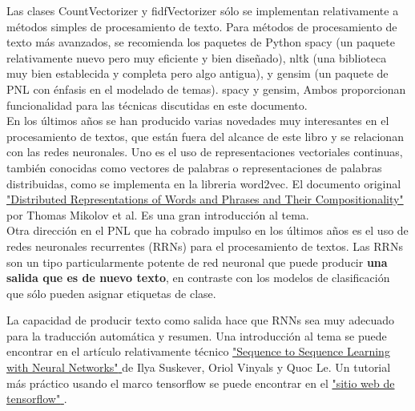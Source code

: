 Las clases {\ttfamily CountVectorizer}  y  {\ttfamily fidfVectorizer} sólo se implementan relativamente a métodos simples   de procesamiento de texto. Para métodos de procesamiento de texto más avanzados,  
se recomienda  los paquetes de Python {\ttfamily spacy} (un paquete relativamente nuevo pero muy  
eficiente y bien diseñado), {\ttfamily nltk} (una biblioteca muy bien establecida y completa pero algo antigua), y {\ttfamily gensim} (un paquete de PNL con énfasis en el modelado de temas). 
 {\ttfamily spacy}   y {\ttfamily gensim,}  Ambos    proporcionan funcionalidad para las técnicas 
discutidas  en  este  documento. \\

En los últimos años se han producido varias novedades muy interesantes en el procesamiento de textos,
que están fuera del alcance de este libro y se relacionan con las redes neuronales.
Uno  es el uso de representaciones vectoriales continuas, también conocidas como vectores
 de palabras o representaciones de palabras distribuidas, como se implementa en la libreria {\ttfamily word2vec}.    El documento original  \href{http://papers.nips.cc/paper/5021-di}{\textcolor{vino}{"{}Distributed Representations of Words and Phrases and  Their Compositionality"{ }} } por Thomas Mikolov et al. Es una gran introducción  al tema. 
   \\

 
 Otra dirección en el PNL que ha cobrado impulso en los últimos años
es el uso de redes neuronales recurrentes (RRNs) para el procesamiento de textos.
Las RRNs son un tipo particularmente potente de red neuronal que puede producir 
{\bf una salida que es de nuevo texto}, en contraste con los modelos de clasificación que sólo pueden asignar
etiquetas de clase. 

La capacidad de producir texto como salida hace que  RNNs sea muy adecuado para 
la traducción automática y resumen.  Una introducción al tema se puede encontrar en el artículo relativamente técnico \href{http://papers.nips.cc/paper/5346-sequence-to-sequence-learning-with-neural-networks.pdf}{\textcolor{vino}{"{}Sequence to 	Sequence Learning with Neural Networks"{}} } de Ilya Suskever,
Oriol Vinyals y Quoc Le.
 Un tutorial más práctico usando el marco {\ttfamily tensorflow}  se puede 
encontrar en el 
\href{https://www.tensorflow.org}{\textcolor{vino}{"{}sitio web de tensorflow"{}} }.













